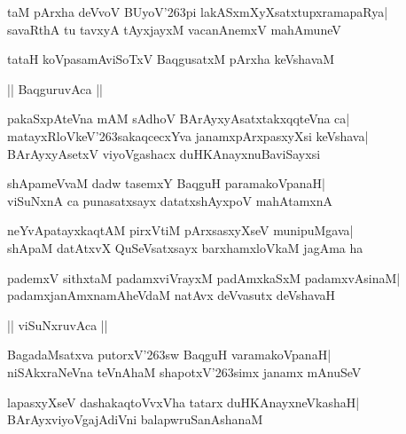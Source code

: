 \documentclass[twoside,12pt,openright]{book}
\def\S{\char'263}
\newcounter{shloka}[chapter]
\begin{document}
\begin{shloka}%
taM pArxha deVvoV BUyoV\S pi lakASxmXyXsatxtupxramapaRya|\\
savaRthA tu tavxyA tAyxjayxM vacanAnemxV mahAmuneV
\end{shloka}

\begin{shloka}%
tataH koVpasamAviSoTxV BaqgusatxM pArxha keVshavaM
\end{shloka}

\begin{center}
|| BaqguruvAca ||
\end{center}
\begin{shloka}%
pakaSxpAteVna mAM sAdhoV BArAyxyAsatxtakxqqteVna ca|\\
matayxRloVkeV\S sakaqcecxYva janamxpArxpasxyXsi keVshava|\\
BArAyxyAsetxV viyoVgashacx duHKAnayxnuBaviSayxsi
\end{shloka}

\begin{shloka}%
shApameVvaM dadw tasemxY BaqguH paramakoVpanaH|\\
viSuNxnA ca punasatxsayx datatxshAyxpoV mahAtamxnA
\end{shloka}

\begin{shloka}%
neYvApatayxkaqtAM pirxVtiM pArxsasxyXseV munipuMgava|\\
shApaM datAtxvX QuSeVsatxsayx barxhamxloVkaM jagAma ha
\end{shloka}

\begin{shloka}%
pademxV sithxtaM padamxviVrayxM padAmxkaSxM padamxvAsinaM|\\
padamxjanAmxnamAheVdaM natAvx deVvasutx deVshavaH
\end{shloka}

\begin{center}
|| viSuNxruvAca ||
\end{center}
\begin{shloka}%
BagadaMsatxva putorxV\S sw BaqguH varamakoVpanaH|\\
niSAkxraNeVna teVnAhaM shapotxV\S simx janamx mAnuSeV
\end{shloka}

\begin{shloka}%
lapasxyXseV dashakaqtoVvxVha tatarx duHKAnayxneVkashaH|\\
BArAyxviyoVgajAdiVni balapwruSanAshanaM
\end{shloka}
\end{document}
